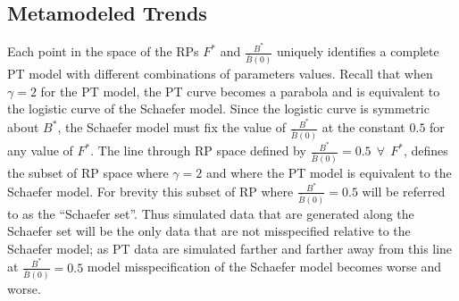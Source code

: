 %
\subsection{Metamodeled Trends \label{ptTrends}}



%
Each point in the space of the RPs $F^*$ and $\frac{B^*}{\bar B(0)}$ uniquely
identifies a complete PT model with different combinations of parameters values.
Recall that when $\gamma=2$ for the PT model, the PT curve becomes a parabola
and is equivalent to the logistic curve of the Schaefer model. Since the
logistic curve is symmetric about $B^*$, the Schaefer model must fix the value of
$\frac{B^*}{\bar B(0)}$ at the constant $0.5$ for any value of $F^*$. The line 
through RP space defined by $\frac{B^*}{\bar B(0)}=0.5 ~~ \forall ~~ F^*$,
defines the subset of RP space where $\gamma=2$ and where the PT model is
equivalent to the Schaefer model. For brevity this subset of RP where $\frac{B^*}{\bar B(0)}=0.5$
will be referred to as the ``Schaefer set''. Thus simulated data that are
generated along the Schaefer set will be the only data that are not
misspecified relative to the Schaefer model; as PT data are simulated
farther and farther away from this line at $\frac{B^*}{\bar B(0)}=0.5$ model
misspecification of the Schaefer model becomes worse and worse.

